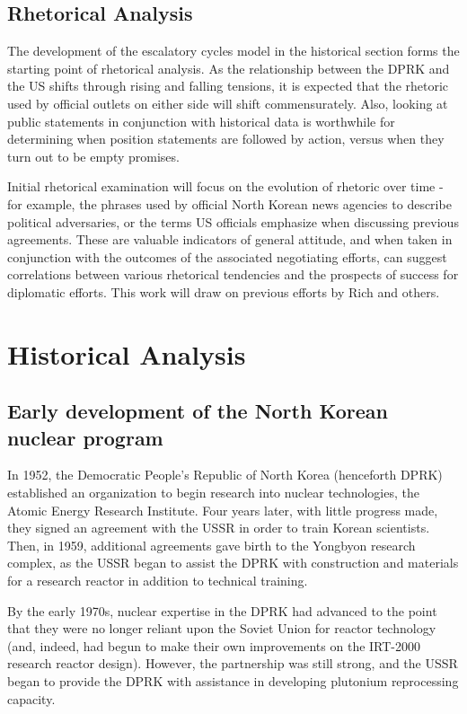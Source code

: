 \documentclass{article}
\begin{document}
\subsection{Rhetorical Analysis}
The development of the escalatory cycles model in the historical section forms the starting point of rhetorical analysis. As the relationship between the DPRK and the US shifts through rising and falling tensions, it is expected that the rhetoric used by official outlets on either side will shift commensurately. Also, looking at public statements in conjunction with historical data is worthwhile for determining when position statements are followed by action, versus when they turn out to be empty promises.

Initial rhetorical examination will focus on the evolution of rhetoric over time - for example, the phrases used by official North Korean news agencies to describe political adversaries, or the terms US officials emphasize when discussing previous agreements. These are valuable indicators of general attitude, and when taken in conjunction with the outcomes of the associated negotiating efforts, can suggest correlations between various rhetorical tendencies and the prospects of success for diplomatic efforts. This work will draw on previous efforts by Rich \cite{rich12, rich14} and others. 

\section{Historical Analysis}

\subsection{Early development of the North Korean nuclear program}
In 1952, the Democratic People’s Republic of North Korea (henceforth DPRK) established an organization to begin research into nuclear technologies, the Atomic Energy Research Institute\cite{ntiAERI}. Four years later, with little progress made, they signed an agreement with the USSR in order to train Korean scientists\cite{nti15}. Then, in 1959, additional agreements gave birth to the Yongbyon research complex, as the USSR began to assist the DPRK with construction and materials for a research reactor in addition to technical training\cite{nti15}.

By the early 1970s, nuclear expertise in the DPRK had advanced to the point that they were no longer reliant upon the Soviet Union for reactor technology (and, indeed, had begun to make their own improvements on the IRT-2000 research reactor design)\cite{nti15}. However, the partnership was still strong, and the USSR began to provide the DPRK with assistance in developing plutonium reprocessing capacity\cite{nti15}.
\end{document}
